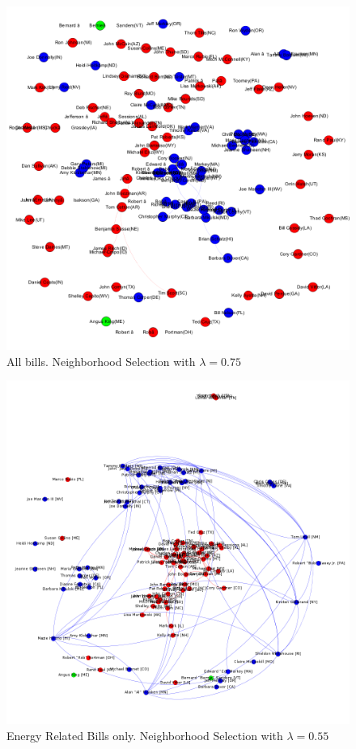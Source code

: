 \documentclass{article}
\begin{document}
\begin{figure} 
\caption{\label{fig: nbd75}All bills. Neighborhood Selection with $\lambda = 0.75$}
  \includegraphics[width=\textwidth]{nbd_75.png}
\end{figure}

\begin{figure} 
\caption{\label{fig: en55}Energy Related Bills only. Neighborhood Selection with $\lambda = 0.55$}
  \includegraphics[width=\textwidth]{energy_55.png}
\end{figure}
\end{document}

